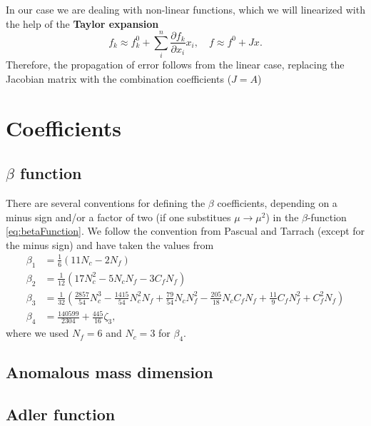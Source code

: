 \documentclass[../../index.tex]{subfiles}
\begin{document}
  In our case we are dealing with non-linear functions, which we will
  linearized with the help of the \textbf{Taylor expansion}
  \begin{equation}
    f_k \approx f_k^0 + \sum_i^n \frac{\partial f_k}{\partial x_i} x_i, \quad f \approx f^0 + Jx.
  \end{equation}
  Therefore, the propagation of error follows from the linear case, replacing
  the Jacobian matrix with the combination coefficients ($J = A$)

  \chapter{Coefficients}
  \label{app:coefficients}
  \section{$\beta$ function}
  \label{sec:betaCoefficients}
  There are several conventions for defining the $\beta$ coefficients, depending
  on a minus sign and/or a factor of two (if one substitues $\mu \to \mu^2$) in
  the $\beta$-function \ref{eq:betaFunction}. We follow the convention from
  Pascual and Tarrach (except for the minus sign) and have taken the values from
  \cite{Boito2011}
  \begin{align}
    \beta_1 &= \frac{1}{6} (11N_c - 2N_f) \\
    \beta_2 &= \frac{1}{12} (17N_c^2 - 5N_cN_f - 3 C_fN_f) \\
    \beta_3 &= \frac{1}{32}\left( \frac{2857}{54}N_c^3 -\frac{1415}{54}N_c^2 N_f + \frac{79}{54} N_c N_f^2 - \frac{205}{18} N_c C_f N_f + \frac{11}{9} C_f N_f^2 + C_f^2 N_f \right) \\
    \beta_4 &= \frac{140599}{2304} + \frac{445}{16}\zeta_3,
  \end{align}
  where we used $N_f=6$ and $N_c=3$ for $\beta_4$.

  \section{Anomalous mass dimension}
  \label{app:gammaCoefficients}

  \section{Adler function}

  
\end{document}
